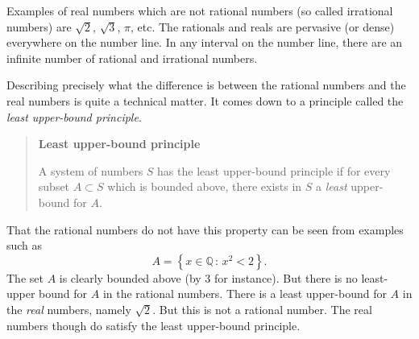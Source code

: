 \documentclass[extrafontsizes, twoside, a4paper]{memoir}
\theoremstyle{plain}%
\theoremstyle{definition}
\theoremstyle{remark}
\begin{document}
Examples of real numbers which are not rational numbers (so called irrational numbers) are $\sqrt{2}$, $\sqrt{3}$, $\pi$, etc. The rationals and reals are pervasive (or dense) everywhere on the number line. In any interval on the number line, there are an infinite number of rational and irrational numbers.

Describing precisely what the difference is between the rational numbers and the real numbers is quite a technical matter. It comes down to a principle called the \emph{least upper-bound principle}.

\begin{quote}
\textbf{Least upper-bound principle}

\noindent
A system of numbers $S$ has the least upper-bound principle if for every subset $A \subset S$ which is bounded above, there exists in $S$ a \emph{least} upper-bound for $A$.
\end{quote}

That the rational numbers do not have this property can be seen from examples such as
$$ A = \left \{ x \in \mathbb{Q} \, : \, x^2 < 2 \right \}.$$
The set $A$ is clearly bounded above (by $3$ for instance). But there is no least-upper bound for $A$ in the rational numbers. There is a least upper-bound for $A$ in the \emph{real} numbers, namely $\sqrt{2}$. But this is not a rational number. The real numbers though do satisfy the least upper-bound principle.

\newpage
\thispagestyle{empty}
\phantom{a}
\cleardoublepage
\end{document}
